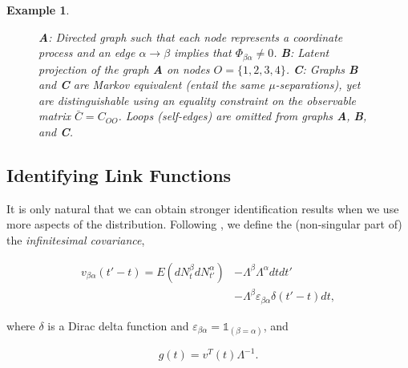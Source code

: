 \documentclass[accepted]{uai2021} %
\newtheorem{exmp}[thm]{Example}
\begin{document}
\begin{exmp}
\begin{figure*}
\begin{subfigure}{0.3\linewidth}
			\end{subfigure}
			\caption{\label{fig:smallCycle} \textbf{A}: Directed graph such 
			that 
			each node represents a coordinate process and an edge $\alpha 
			\rightarrow \beta$ implies that $\Phi_{\beta\alpha}\neq 0$. 
			\textbf{B}: Latent projection of the graph \textbf{A} on nodes $O = 
			\{1,2,3,4\}$. \textbf{C}: Graphs \textbf{B} and \textbf{C} are 
			Markov 
			equivalent (entail the same $\mu$-separations), yet are 
			distinguishable using an equality constraint on the observable 
			matrix $\bar{C} = C_{OO}$. Loops 
			(self-edges) are omitted from 
			graphs \textbf{A}, \textbf{B}, and \textbf{C}.}
		\end{figure*}
\end{exmp}



\subsection{Identifying Link Functions}
\label{ssec:idCauFunc}

It is only natural that we can obtain stronger identification results when we 
use more aspects of the distribution. Following 
\cite{bacry2016}, we define the (non-singular part of) the \emph{infinitesimal 
covariance},

\begin{align}
	v_{\beta\alpha}(t' - t) = E(dN_t^\beta dN_{t'}^\alpha) & - 
	\Lambda^\beta\Lambda^\alpha dt dt' \nonumber \\ & - \Lambda^\beta 
	\varepsilon_{\beta\alpha}
	\delta(t'-t) dt,
	\label{eq:infv}
\end{align}


where $\delta$ is a Dirac delta function and $\varepsilon_{\beta\alpha} = 
\mathds{1}_{(\beta=\alpha)}$, and

$$
g(t) = v^T(t)\Lambda^{-1}.
$$
\end{document}
